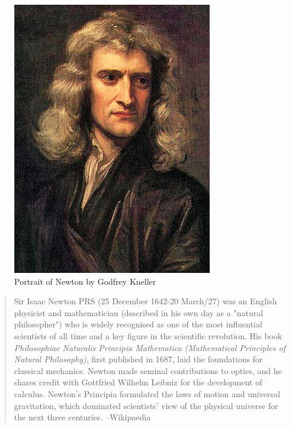 \newpage %
\thispagestyle{empty}
\begin{figure}[H]
\centering
\includegraphics[scale=.5]{src/images/lbk-graphics/portraits/newton-wiki.jpg}
\caption*{Portrait of Newton by Godfrey Kneller}
\end{figure}


\begin{small}
\begin{quote}
Sir Isaac Newton PRS (25 December 1642-20 March/27)
was an English physicist and mathematician\lbk 
(described in
his own day as a "natural philosopher") who is widely
recognised as one of the most influential scientists of 
all
time and a key figure in the scientific revolution. 
His book \textsl{Philosophiae Naturalis Principia Mathematica
(Mathematical Principles of Natural Philosophy)}, first
published in 1687, laid the foundations for classical
mechanics. Newton made seminal contributions to optics,
and he shares credit with Gottfried Wilhelm Leibniz for
the development of calculus.
\enlargethispage{1\bsk}
Newton's Principia formulated the laws of motion and
universal gravitation, which dominated scientists' view
of the physical universe for the next three centuries.
\hfill --Wikipaedia
\end{quote}
\end{small}

\newpage

\renewcommand{\thesection}{1.\arabic{section}}

